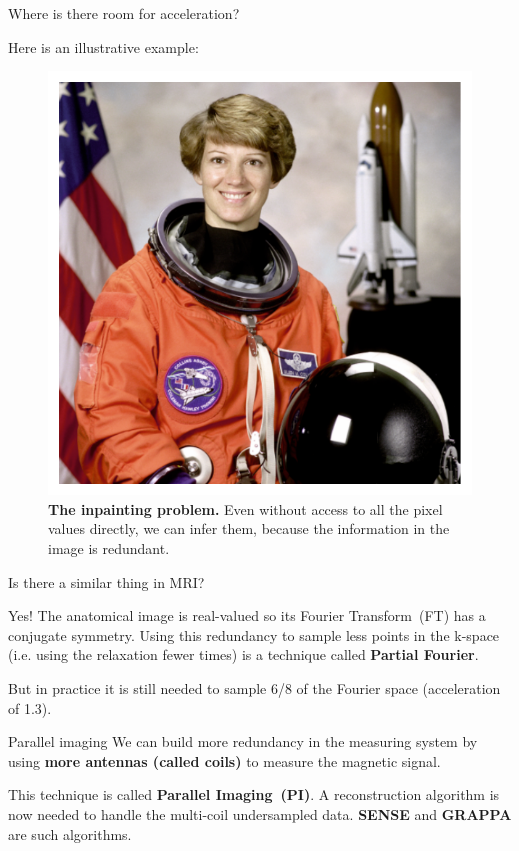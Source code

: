 \begin{frame}{Where is there room for acceleration?}
\begin{overprint}
    \hfill \break
    Here is an illustrative example:
    \begin{figure}
        \centering
        \includegraphics[height=0.4\textheight]{Figures/intro_figures/astronaut.pdf}
        \caption{\label{fig:astronaut}\textbf{The inpainting problem.} Even without access to all the pixel values directly, we can infer them, because the information in the image is redundant.
        }
    \end{figure}
    
        \hfill \break
        Is there a similar thing in MRI?

        Yes! The anatomical image is real-valued so its Fourier Transform~(FT) has a conjugate symmetry.
        Using this redundancy to sample less points in the k-space (i.e. using the relaxation fewer times) is a technique called \textbf{Partial Fourier}.
        
        But in practice it is still needed to sample 6/8 of the Fourier space (acceleration of 1.3).
    
    \end{overprint}
    
\end{frame}

\begin{frame}{Parallel imaging}
    We can build more redundancy in the measuring system by using \textbf{more antennas (called coils)} to measure the magnetic signal.
    
    This technique is called \textbf{Parallel Imaging~(PI)}. 
    A reconstruction algorithm is now needed to handle the multi-coil undersampled data.
        \textbf{SENSE} and \textbf{GRAPPA} are such algorithms.    
\end{frame}

